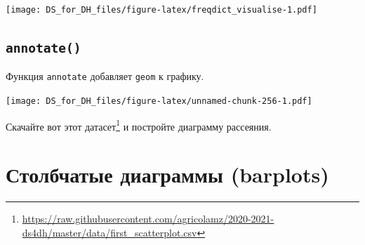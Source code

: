 \documentclass[
]{book}
\makeatletter
\newenvironment{Shaded}{\begin{snugshade}}{\end{snugshade}}
\newcommand{\CharTok}[1]{\textcolor[rgb]{0.31,0.60,0.02}{#1}}
\newcommand{\DataTypeTok}[1]{\textcolor[rgb]{0.13,0.29,0.53}{#1}}
\newcommand{\DecValTok}[1]{\textcolor[rgb]{0.00,0.00,0.81}{#1}}
\newcommand{\FloatTok}[1]{\textcolor[rgb]{0.00,0.00,0.81}{#1}}
\newcommand{\KeywordTok}[1]{\textcolor[rgb]{0.13,0.29,0.53}{\textbf{#1}}}
\newcommand{\NormalTok}[1]{#1}
\newcommand{\OperatorTok}[1]{\textcolor[rgb]{0.81,0.36,0.00}{\textbf{#1}}}
\newcommand{\StringTok}[1]{\textcolor[rgb]{0.31,0.60,0.02}{#1}}
\renewcommand{\href}[2]{#2\footnote{\url{#1}}}
\newenvironment{kframe}{%
    \medskip{}
    \setlength{\fboxsep}{.8em}
    \def\at@end@of@kframe{}%
    \ifinner\ifhmode%
    \def\at@end@of@kframe{\end{minipage}}%
    \begin{minipage}{\columnwidth}%
    \fi\fi%
    \def\FrameCommand##1{\hskip\@totalleftmargin \hskip-\fboxsep
    \colorbox{shadecolor}{##1}\hskip-\fboxsep
        \hskip-\linewidth \hskip-\@totalleftmargin \hskip\columnwidth}%
    \MakeFramed {\advance\hsize-\width
      \@totalleftmargin\z@ \linewidth\hsize
      \@setminipage}}%
  {\par\unskip\endMakeFramed%
    \at@end@of@kframe}
\newenvironment{rmdblock}[1]
  {
    \begin{itemize}
    \renewcommand{\labelitemi}{
      \raisebox{-.7\height}[0pt][0pt]{
        {\setkeys{Gin}{width=3em,keepaspectratio}\texttt{[image: images/\#1]}}
        }
        }
        \setlength{\fboxsep}{1em}
        \begin{kframe}
        \item
      }
      {
        \end{kframe}
        \end{itemize}
      }
\newenvironment{rmdtask}
      {\begin{rmdblock}{task}}
      {\end{rmdblock}}
\makeatother
\begin{document}
\texttt{[image: DS\_for\_DH\_files/figure-latex/freqdict\_visualise-1.pdf]}

\hypertarget{annotate}{%
\subsection{\texorpdfstring{\texttt{annotate()}}{annotate()}}\label{annotate}}

Функция \texttt{annotate} добавляет \texttt{geom} к графику.

\begin{Shaded}
\end{Shaded}

\texttt{[image: DS\_for\_DH\_files/figure-latex/unnamed-chunk-256-1.pdf]}

\begin{rmdtask}
Скачайте
\href{https://raw.githubusercontent.com/agricolamz/2020-2021-ds4dh/master/data/first_scatterplot.csv}{вот
этот датасет} и постройте диаграмму рассеяния.
\end{rmdtask}

\hypertarget{ux441ux442ux43eux43bux431ux447ux430ux442ux44bux435-ux434ux438ux430ux433ux440ux430ux43cux43cux44b-barplots}{%
\section{Столбчатые диаграммы (barplots)}\label{ux441ux442ux43eux43bux431ux447ux430ux442ux44bux435-ux434ux438ux430ux433ux440ux430ux43cux43cux44b-barplots}}
\end{document}
